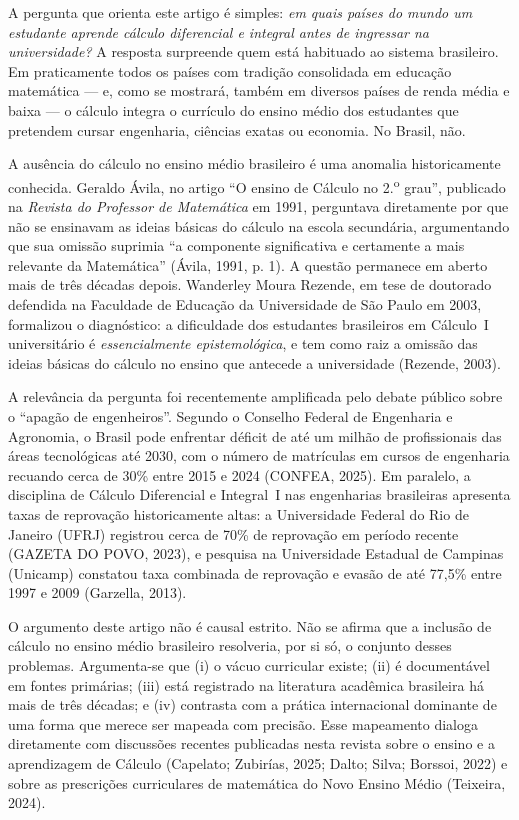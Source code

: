 \documentclass[12pt,a4paper,oneside]{article}
\begin{document}
A pergunta que orienta este artigo é simples: \emph{em quais países do
mundo um estudante aprende cálculo diferencial e integral antes de
ingressar na universidade?} A resposta surpreende quem está habituado ao
sistema brasileiro. Em praticamente todos os países com tradição
consolidada em educação matemática --- e, como se mostrará, também em
diversos países de renda média e baixa --- o cálculo integra o currículo
do ensino médio dos estudantes que pretendem cursar engenharia, ciências
exatas ou economia. No Brasil, não.

A ausência do cálculo no ensino médio brasileiro é uma anomalia
historicamente conhecida. Geraldo Ávila, no artigo ``O ensino de Cálculo
no 2.\textsuperscript{o} grau'', publicado na \emph{Revista do Professor
de Matemática} em 1991, perguntava diretamente por que não se ensinavam
as ideias básicas do cálculo na escola secundária, argumentando que sua
omissão suprimia ``a componente significativa e certamente a mais
relevante da Matemática'' (Ávila, 1991, p. 1). A questão permanece em
aberto mais de três décadas depois. Wanderley Moura Rezende, em tese de
doutorado defendida na Faculdade de Educação da Universidade de São Paulo
em 2003, formalizou o diagnóstico: a dificuldade dos estudantes
brasileiros em Cálculo~I universitário é \emph{essencialmente
epistemológica}, e tem como raiz a omissão das ideias básicas do cálculo
no ensino que antecede a universidade (Rezende, 2003).

A relevância da pergunta foi recentemente amplificada pelo debate público
sobre o ``apagão de engenheiros''. Segundo o Conselho Federal de
Engenharia e Agronomia, o Brasil pode enfrentar déficit de até um milhão
de profissionais das áreas tecnológicas até 2030, com o número de
matrículas em cursos de engenharia recuando cerca de 30\% entre 2015 e
2024 (CONFEA, 2025). Em paralelo, a disciplina de Cálculo Diferencial e
Integral~I nas engenharias brasileiras apresenta taxas de reprovação
historicamente altas: a Universidade Federal do Rio de Janeiro (UFRJ)
registrou cerca de 70\% de reprovação em período recente (GAZETA DO POVO,
2023), e pesquisa na Universidade Estadual de Campinas (Unicamp)
constatou taxa combinada de reprovação e evasão de até 77,5\% entre 1997
e 2009 (Garzella, 2013).

O argumento deste artigo não é causal estrito. Não se afirma que a
inclusão de cálculo no ensino médio brasileiro resolveria, por si só, o
conjunto desses problemas. Argumenta-se que (i) o vácuo curricular
existe; (ii) é documentável em fontes primárias; (iii) está registrado na
literatura acadêmica brasileira há mais de três décadas; e (iv) contrasta
com a prática internacional dominante de uma forma que merece ser mapeada
com precisão. Esse mapeamento dialoga diretamente com discussões recentes
publicadas nesta revista sobre o ensino e a aprendizagem de Cálculo
(Capelato; Zubirías, 2025; Dalto; Silva; Borssoi, 2022) e sobre as
prescrições curriculares de matemática do Novo Ensino Médio (Teixeira,
2024).
\end{document}
